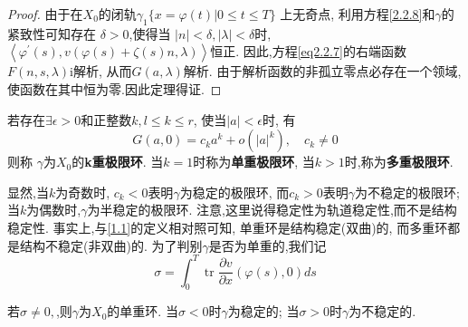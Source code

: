 \begin{proof}
  由于在$X_{0}$的闭轨$  \gamma_{1}\{
  x=\varphi(t) | 0 \leqslant t \leqslant T
  \}$
  上无奇点,
  利用方程\eqref{2.2.8}和$\gamma$的紧致性可知存在
  $\delta>0$,使得当
  $|n|<\delta,|\lambda|<\delta$时,
  $\left\langle\varphi^{\prime}(s), v(\varphi(s)+\zeta(s) n, \lambda)\right\rangle$恒正.
  因此,方程\eqref{eq2.2.7}的右端函数$F(n,s,\lambda)$i解析,
  从而$G(a,\lambda)$解析.
  由于解析函数的非孤立零点必存在一个领域,使函数在其中恒为零.因此定理得证.
\end{proof}

\begin{defination}
  若存在$\exists \epsilon >0$和正整数$k,l \leqslant k \leqslant r$,
  使当$|a|< \epsilon$时,
  有
  \begin{equation}
    \label{eq2.2.13}
G(a, 0)=c_{k} a^{k}+o\left(|a|^{k}\right), \quad c_{k} \neq 0
\end{equation}
则称
$\gamma$为$X_{0}$的\textbf{k重极限环}.
当$k=1$时称为\textbf{单重极限环},
当$k>1$时,称为\textbf{多重极限环}.
\end{defination}
显然,当$k$为奇数时,
$c_k<0$表明$\gamma$为稳定的极限环,
而$c_k>0$表明$\gamma$为不稳定的极限环;
当$k$为偶数时,$\gamma$为半稳定的极限环.
注意,这里说得稳定性为轨道稳定性,而不是结构稳定性.
事实上,与\ref{1.1}的定义相对照可知,
单重环是结构稳定(双曲)的,
而多重环都是结构不稳定(非双曲)的.
为了判别$\gamma$是否为单重的,我们记
\begin{equation}
  \label{eq2.2.14}
  \sigma=\int_{0}^{T} \operatorname{tr} \frac{\partial v}{\partial x}(\varphi(s), 0) d s
\end{equation}
\begin{theorem}
  \label{thm:2.2.5}
  若$\sigma \neq 0,$,则$\gamma$为$X_{0}$的单重环.
  当$\sigma < 0$时$\gamma$为稳定的;
  当$\sigma>0$时$\gamma$为不稳定的.
\end{theorem}

